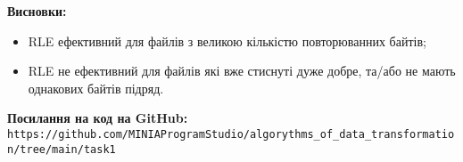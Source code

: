 \documentclass{article}
\def\code#1{\texttt{#1}}
\begin{document}
\textbf{Висновки:}
\begin{itemize}
\item RLE ефективний для файлів з великою кількістю повторюванних байтів;
\item RLE не ефективний для файлів які вже стиснуті дуже добре, та/або не мають однакових байтів підряд.
\end{itemize}

\textbf{Посилання на код на GitHub:}\\
\code{https://github.com/MINIAProgramStudio/algorythms\_of\_data\_transformation/tree/main/task1}
\end{document}
